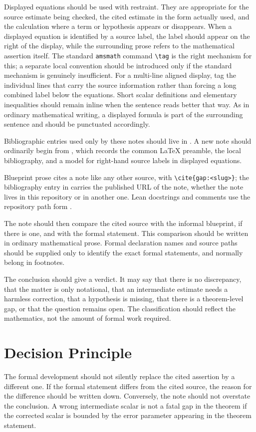 \documentclass[11pt]{article}
\begin{document}
Displayed equations should be used with restraint.  They are appropriate for the
source estimate being checked, the cited estimate in the form actually used, and
the calculation where a term or hypothesis appears or disappears.  When a
displayed equation is identified by a source label, the label should appear on
the right of the display, while the surrounding prose refers to the mathematical
assertion itself.  The standard \texttt{amsmath} command \verb|\tag| is the
right mechanism for this; a separate local convention should be introduced only
if the standard mechanism is genuinely insufficient.  For a multi-line aligned
display, tag the individual lines that carry the source information rather than
forcing a long combined label below the equations.  Short
scalar definitions and elementary inequalities should remain inline when the
sentence reads better that way.  As in ordinary mathematical writing, a displayed
formula is part of the surrounding sentence and should be punctuated accordingly.

Bibliographic entries used only by these notes should live in
.  A new note should ordinarily begin from
, which records the common LaTeX preamble,
the local bibliography, and a model for right-hand source labels in displayed
equations.

Blueprint prose cites a note like any other source, with
\verb|\cite{gap:<slug>}|; the bibliography entry in
 carries the published URL of the note,
whether the note lives in this repository or in another one.  Lean docstrings
and comments use the repository path form .

The note should then compare the cited source with the informal blueprint, if
there is one, and with the formal statement.  This comparison should be written
in ordinary mathematical prose.  Formal declaration names and source paths should
be supplied only to identify the exact formal statements, and normally belong in
footnotes.

The conclusion should give a verdict.  It may say that there is no discrepancy,
that the matter is only notational, that an intermediate estimate needs a
harmless correction, that a hypothesis is missing, that there is a theorem-level
gap, or that the question remains open.  The classification should reflect the
mathematics, not the amount of formal work required.

\section{Decision Principle}

The formal development should not silently replace the cited assertion by a
different one.  If the formal statement differs from the cited source, the
reason for the difference should be written down.  Conversely, the note should
not overstate the conclusion.  A wrong intermediate scalar is not a fatal gap in
the theorem if the corrected scalar is bounded by the error parameter appearing
in the theorem statement.
\end{document}
